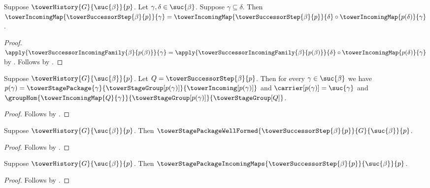 \begin{proposition}\label{tower_successor_step_coherence}
    Suppose $\towerHistory{G}{\suc{\beta}}{p}$.
    Let $\gamma,\delta\in\suc{\beta}$.
    Suppose $\gamma\subseteq\delta$.
    Then $\towerIncomingMap{\towerSuccessorStep{\beta}{p}}{\gamma}=
        \towerIncomingMap{\towerSuccessorStep{\beta}{p}}{\delta}\circ
            \towerIncomingMap{p(\delta)}{\gamma}$.
\end{proposition}
\begin{proof}
    $\apply{\towerSuccessorIncomingFamily{\beta}{p(\beta)}}{\gamma}
        =\apply{\towerSuccessorIncomingFamily{\beta}{p(\beta)}}{\delta}
            \circ\towerIncomingMap{p(\delta)}{\gamma}$ by
        .
    Follows by .
\end{proof}

\begin{proposition}\label{tower_successor_step_predecessor_laws}
    Suppose $\towerHistory{G}{\suc{\beta}}{p}$.
    Let $Q=\towerSuccessorStep{\beta}{p}$.
    Then for every $\gamma\in\suc{\beta}$ we have
        $p(\gamma)=\towerStagePackage{\gamma}
            {\towerStageGroup[p(\gamma)]}{\towerIncoming[p(\gamma)]}$ and
        $\carrier[p(\gamma)]=\suc{\gamma}$ and
        $\groupHom
            {\towerIncomingMap{Q}{\gamma}}
            {\towerStageGroup[p(\gamma)]}
            {\towerStageGroup[Q]}$.
\end{proposition}
\begin{proof}
    Follows by
        .
\end{proof}

\begin{proposition}\label{tower_successor_step_well_formed}
    Suppose $\towerHistory{G}{\suc{\beta}}{p}$.
    Then $\towerStagePackageWellFormed
        {\towerSuccessorStep{\beta}{p}}{G}{\suc{\beta}}{p}$.
\end{proposition}
\begin{proof}
    Follows by
        .
\end{proof}

\begin{proposition}\label{tower_successor_step_incoming_maps}
    Suppose $\towerHistory{G}{\suc{\beta}}{p}$.
    Then $\towerStagePackageIncomingMaps
        {\towerSuccessorStep{\beta}{p}}{\suc{\beta}}{p}$.
\end{proposition}
\begin{proof}
    Follows by
        .
\end{proof}

